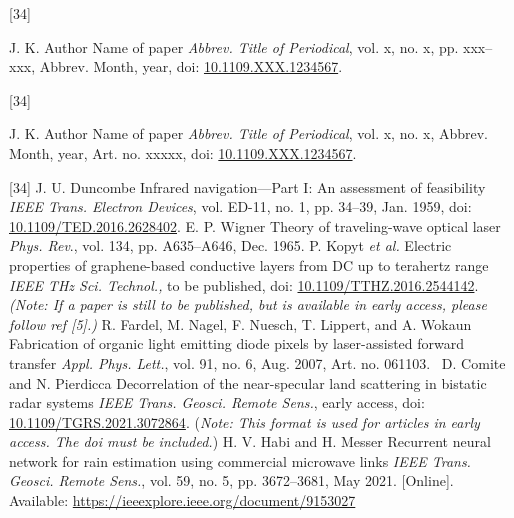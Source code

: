\documentclass[letter]{IEEEtaes}
\begin{document}
\correspauthor%


\vspace*{-12pt}
\def\refname{}
\begin{thebibliography}{[34]}
\item[]  J. K. Author
\newblock Name of paper
\newblock \emph{Abbrev. Title of Periodical}, vol. x, no. x, pp. xxx--xxx, Abbrev. Month, year, doi: \href{https://dx.doi.org/10.1109.XXX.1234567}{10.1109.XXX.1234567}.
\end{thebibliography}

\def\refname{}
\begin{thebibliography}{[34]}\vspace*{-12pt}
\item[] J. K. Author
\newblock Name of paper
\newblock \emph{Abbrev. Title of Periodical}, vol. x, no. x, Abbrev. Month, year, Art. no. xxxxx, doi: \href{https://dx.doi.org/10.1109.XXX.1234567}{10.1109.XXX.1234567}.
\end{thebibliography}

\vspace*{-12pt}
\begin{thebibliography}{[34]}
\setcounter{enumiv}{0}
J. U. Duncombe
\newblock Infrared navigation---Part I: An assessment of feasibility
\newblock \emph{IEEE Trans. Electron Devices}, vol. ED-11, no. 1, pp. 34--39, Jan. 1959, doi: \href{https://dx.doi.org/10.1109/TED.2016.2628402}{10.1109/TED.2016.2628402}.
E. P. Wigner
\newblock Theory of traveling-wave optical laser
\newblock \emph{Phys. Rev}., vol. 134, pp. A635--A646, Dec. 1965.
P. Kopyt \emph{et al.}
\newblock Electric properties of graphene-based conductive layers from DC up to terahertz range
\newblock \emph{IEEE THz Sci. Technol.,} to be published, doi: \href{https://dx.doi.org/10.1109/TTHZ.2016.2544142}{\url{10.1109/TTHZ.2016.2544142}}. \emph{(Note: If a paper is still to be published, but is available in early access, please follow ref {[}5{]}.)}
R. Fardel, M. Nagel, F. Nuesch, T. Lippert, and A. Wokaun
\newblock  Fabrication of organic light emitting diode pixels by laser-assisted forward transfer
\newblock \emph{Appl. Phys. Lett.}, vol. 91, no. 6, Aug. 2007, Art. no. 061103.~
D. Comite and N. Pierdicca
\newblock Decorrelation of the near-specular land scattering in bistatic radar systems
\newblock \emph{IEEE Trans. Geosci. Remote Sens.}, early access, doi: \href{https://dx.doi.org/10.1109/TGRS.2021.3072864}{\url{10.1109/TGRS.2021.3072864}}. (\emph{Note: This format is used for articles in early access. The doi must be included.})
H. V. Habi and H. Messer
\newblock Recurrent neural network for rain estimation using commercial microwave links
\newblock \emph{IEEE Trans. Geosci. Remote Sens.}, vol. 59, no. 5, pp. 3672--3681, May 2021. {[}Online{]}. Available: \href{https://ieeexplore.ieee.org/document/9153027}{\url{https://ieeexplore.ieee.org/document/9153027}}
\end{thebibliography}
\end{document}
